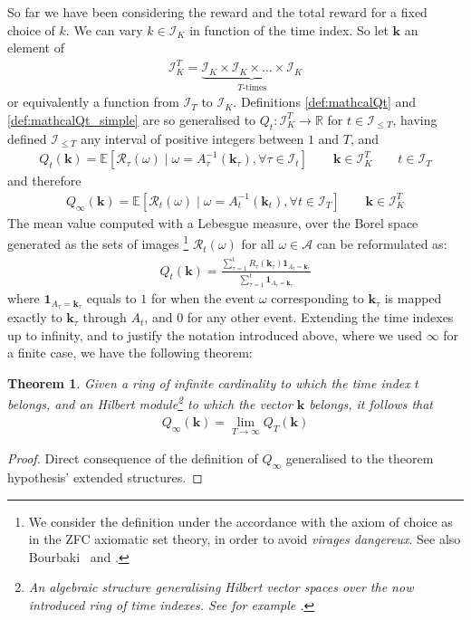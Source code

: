 \documentclass[]{scrartcl}
\newtheorem{theorem}{Theorem}[section]
\theoremstyle{definition}
\begin{document}
So far we have been considering the reward and the total reward for a fixed choice of $k$. We can vary $k\in \mathcal{I}_K$ in function of the time index. So let $\mathbf{k}$ an element of
\begin{align*}
\mathcal{I}_K^T = \underbrace{\mathcal{I}_K\times \mathcal{I}_K \times \dots \times \mathcal{I}_K}_{T\text{-times}}
\end{align*}
or equivalently a function from $\mathcal{I}_T$ to $\mathcal{I}_K$. 
Definitions \ref{def:mathcalQt} and \ref{def:mathcalQt_simple} are so generalised to $Q_t:\mathcal{I}_K^T \rightarrow \mathbb{R}$ for $t\in\mathcal{I}_{\leq T}$, having defined $\mathcal{I}_{\leq T}$ any interval of positive integers between $1$ and $T$, and
\begin{align*}
Q_t(\mathbf{k}) = \mathbb{E} \left[ \mathcal{R}_{\tau}(\omega)
\mid
\omega = A^{-1}_{\tau}(\mathbf{k}_{\tau}), \forall \tau \in \mathcal{I}_t \right]
\qquad 
\mathbf{k} \in \mathcal{I}_K^T
\qquad
t \in \mathcal{I}_T
\end{align*}
and therefore 
\begin{align*}
Q_{\infty}(\mathbf{k}) = \mathbb{E} \left[ \mathcal{R}_{t}(\omega)
\mid
\omega = A^{-1}_{t}(\mathbf{k}_{t}),  \forall t \in \mathcal{I}_T \right]
\qquad 
\mathbf{k} \in \mathcal{I}_K^T
\end{align*}
The mean value computed with a Lebesgue measure, over the Borel space generated as the sets of images 
\footnote{
    We consider the definition under the accordance with the axiom of choice as in the ZFC axiomatic set theory, in order to avoid \emph{virages dangereux}. See also Bourbaki~\cite{bourbaki2004theory} and \cite{takeuti1982classes}.
} $\mathcal{R}_t(\omega)$ for all $\omega \in \mathcal{A}$ can be reformulated as:
\begin{align*}
Q_t(\mathbf{k}) 
= 
\frac
{\sum_{\tau=1}^{t} R_{\tau}(\mathbf{k}_{\tau}) \mathbf{1}_{A_\tau = \mathbf{k}_{\tau}}}
{\sum_{\tau=1}^{t} \mathbf{1}_{A_\tau = \mathbf{k}_{\tau}}}
\end{align*}
where $\mathbf{1}_{A_\tau = \mathbf{k}_{\tau}}$ equals to $1$ for when the event $\omega$ corresponding to $\mathbf{k}_{\tau}$ is mapped exactly to $\mathbf{k}_{\tau}$ through $A_t$, and $0$ for any other event.
Extending the time indexes up to infinity, and to justify the notation introduced above, where we used $\infty$ for a finite case, we have the following theorem:
\begin{theorem}\label{th:bourbaki}
Given a ring of infinite cardinality to which the time index $t$ belongs, and an Hilbert module\footnote{An algebraic structure generalising Hilbert vector spaces over the now introduced ring of time indexes. See for example \cite{bourbaki1987topological}.} to which the vector $\mathbf{k}$ belongs, it follows that
\begin{align*}
Q_{\infty}(\mathbf{k}) = \lim_{T \rightarrow \infty} Q_{T}(\mathbf{k})
\end{align*}
\end{theorem}
\begin{proof}
    Direct consequence of the definition of $Q_{\infty}$ generalised to the theorem hypothesis' extended structures.
\end{proof}
\end{document}
